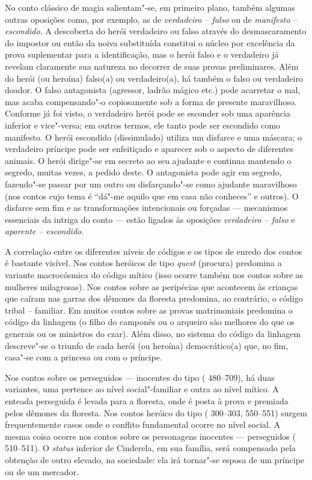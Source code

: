 {No conto clássico de magia salientam"-se, em primeiro plano, também
algumas outras oposições como, por exemplo, as de \emph{verdadeiro --
falso} ou de \emph{manifesto -- escondido}. A descoberta do herói verdadeiro
ou falso através do desmascaramento do impostor ou então da noiva
substituída constitui o núcleo por excelência da prova suplementar para
a identificação, mas o herói falso e o verdadeiro já revelam claramente
sua natureza no decorrer de suas provas preliminares. Além do herói (ou
heroína) falso(a) ou verdadeiro(a), há também o falso ou verdadeiro
doador. O falso antagonista (agressor, ladrão mágico etc.) pode
acarretar o mal, mas acaba compensando"-o copiosamente sob a forma de
presente maravilhoso. Conforme já foi visto, o verdadeiro herói pode se
esconder sob uma aparência inferior e vice"-versa; em outros termos, ele
tanto pode ser escondido como manifesto. O herói escondido (dissimulado)
utiliza um disfarce e uma máscara; o verdadeiro príncipe pode ser
enfeitiçado e aparecer sob o aspecto de diferentes animais. O herói
dirige"-se em secreto ao seu ajudante e continua mantendo o segredo,
muitas vezes, a pedido deste. O antagonista pode agir em segredo,
fazendo"-se passar por um outro ou disfarçando"-se como ajudante
maravilhoso (nos contos cujo tema é ``dá"-me aquilo que em casa não
conheces'' e outros). O disfarce sem fim e as transformações
intencionais ou forçadas --- mecanismos essenciais da intriga do conto ---
estão ligados às oposições \emph{verdadeiro -- falso} e \emph{aparente -- escondido}.

A correlação entre os diferentes níveis de códigos e os tipos de enredo
dos contos é bastante visível. Nos contos heróicos de
tipo \emph{quest} (procura) predomina a variante macrocósmica do código
mítico (isso ocorre também nos contos sobre as mulheres milagrosas). Nos
contos sobre as peripécias que acontecem às crianças que caíram nas
garras dos dêmones da floresta predomina, ao contrário, o código tribal
-- familiar. Em muitos contos sobre as provas matrimoniais predomina o
código da linhagem (o filho do camponês ou o arqueiro são melhores do
que os generais ou os ministros do czar). Além disso, no sistema do
código da linhagem descreve"-se o triunfo de cada herói (ou heroína)
democrático(a) que, no fim, casa"-se com a princesa ou com o príncipe.

Nos contos sobre os perseguidos --- inocentes do tipo ( 480--709), há
duas variantes, uma pertence ao nível social"-familiar e outra ao nível
mítico. A enteada perseguida é levada para a floresta, onde é posta à
prova e premiada pelos dêmones da floresta. Nos contos heróico do tipo
( 300--303, 550--551) surgem frequentemente casos onde o conflito
fundamental ocorre no nível social. A mesma coisa ocorre nos contos
sobre os personagens inocentes --- perseguidos ( 510--511).
O \emph{status} inferior de Cinderela, em sua família, será compensado
pela obtenção de outro elevado, na sociedade: ela irá tornar"-se esposa
de um príncipe ou de um mercador.

}
